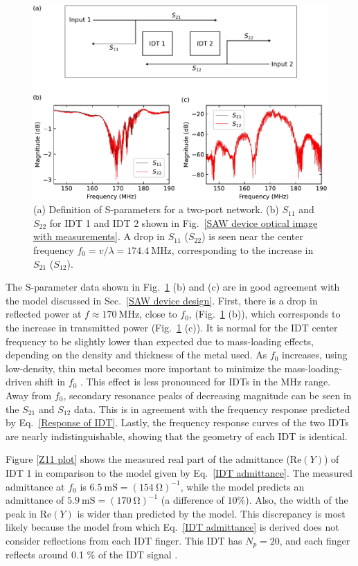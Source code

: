 \documentclass[double,12pt,1in,seploa]{beavtex}
\begin{document}
\begin{figure}
    \includegraphics[width = 1\textwidth]{S-parameters.pdf}
    \caption{(a) Definition of S-parameters for a two-port network. (b) $S_{11}$ and $S_{22}$ for IDT 1 and IDT 2 shown in Fig.\ \ref{SAW device optical image with measurements}. A drop in $S_{11}$ ($S_{22}$) is seen near the center frequency $f_0 = v/\lambda = \SI{174.4}{\mega\hertz}$, corresponding to the increase in $S_{21}$ ($S_{12}$).}
    \label{S-parameters}
\end{figure}
The S-parameter data shown in Fig.\ \ref{S-parameters} (b) and (c) are in good agreement with the model discussed in Sec.\ \ref{SAW device design}. First, there is a drop in reflected power at $f \approx \SI{170}{\mega\hertz}$, close to $f_0$, (Fig.\ \ref{S-parameters} (b)), which corresponds to the increase in transmitted power (Fig.\ \ref{S-parameters} (c)). It is normal for the IDT center frequency to be slightly lower than expected due to mass-loading effects, depending on the density and thickness of the metal used. As $f_0$ increases, using low-density, thin metal becomes more important to minimize the mass-loading-driven shift in $f_0$ \cite{chen_ultrahigh-frequency_2020}. This effect is less pronounced for IDTs in the MHz range. Away from $f_0$, secondary resonance peaks of decreasing magnitude can be seen in the $S_{21}$ and $S_{12}$ data. This is in agreement with the frequency response predicted by Eq.\ \ref{Response of IDT}. Lastly, the frequency response curves of the two IDTs are nearly indistinguishable, showing that the geometry of each IDT is identical. 

Figure \ref{Z11 plot} shows the measured real part of the admittance ($\mathrm{Re}(Y)$) of IDT 1 in comparison to the model given by Eq.\ \ref{IDT admittance}. The measured admittance at $f_0$ is $\SI{6.5}{\milli\siemens} = (\SI{154}{\ohm})^{-1}$, while the model predicts an admittance of $\SI{5.9}{\milli\siemens} = (\SI{170}{\ohm})^{-1}$ (a difference of $10\%$). Also, the width of the peak in $\mathrm{Re}(Y)$ is wider than predicted by the model. This discrepancy is most likely because the model from which Eq.\ \ref{IDT admittance} is derived does not consider reflections from each IDT finger. This IDT has $N_p = 20$, and each finger reflects around 0.1  \% of the IDT signal \cite[p.\ 140]{lane_integrating_2021}.
\end{document}
